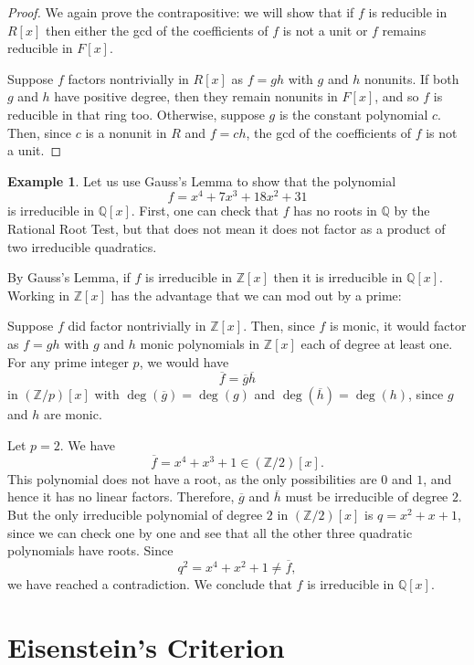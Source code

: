 \documentclass[12pt]{report}
\numberwithin{equation}{section}
\numberwithin{theorem}{chapter}
\theoremstyle{definition}
\newtheorem{example}[theorem]{Example}
\newtheorem*{basic properties}{Basic Properties}
\newtheorem*{Important Remark}{Important Remark}
\begin{document}
\begin{proof}
We again prove the contrapositive: we will show that if $f$ is reducible in $R[x]$ then either the gcd of the coefficients of $f$ is not a unit or $f$ remains  reducible in $F[x]$. 

Suppose $f$ factors nontrivially in $R[x]$ as $f = g h$ with $g$ and $h$ nonunits.
If both $g$ and $h$ have positive degree, then they remain nonunits in $F[x]$, and so $f$  is reducible in that ring too. Otherwise, suppose $g$ is the constant polynomial $c$.
Then, since $c$ is a nonunit in $R$ and $f = c h$, the gcd of the coefficients of $f$ is not a unit. 
\end{proof}




\begin{example} 
Let us use Gauss's Lemma to show that the polynomial 
$$f = x^4 + 7x^3 + 18x^2 + 31$$ 
is irreducible in $\mathbb{Q}[x]$. First, one can check that $f$ has no roots in $\mathbb{Q}$ by
  the Rational Root Test, but that does not mean it does not factor as a product of two irreducible quadratics.

By Gauss's Lemma, if $f$ is irreducible in $\mathbb{Z}[x]$ then it is irreducible in $\mathbb{Q}[x]$.  Working in $\mathbb{Z}[x]$ has the advantage that we can mod out by a prime:

Suppose $f$ did factor nontrivially in $\mathbb{Z}[x]$. Then, since $f$ is monic, it would factor as $f = g h$ with $g$ and $h$ monic polynomials in $\mathbb{Z}[x]$ each of degree at least one. For any prime integer $p$, we would have 
$$\overline{f} = \overline{g} \overline{h}$$ 
in $(\mathbb{Z}/p)[x]$ with $\deg(\overline{g}) = \deg(g)$ and $\deg(\overline{h}) = \deg(h)$, since $g$ and $h$ are monic. 

Let $p = 2$. We have 
$$\overline{f} = x^4 + x^3 + 1 \in (\mathbb{Z}/2)[x].$$ 
This polynomial does not have a root, as the only possibilities are $0$ and $1$, and hence it has no linear factors. Therefore, $\overline{g}$ and $\overline{h}$ must be irreducible of degree $2$. 
But the only irreducible polynomial of degree $2$ in $(\mathbb{Z}/2)[x]$ is $q = x^2+x + 1$, since we can check one by one and see that all the other three quadratic polynomials have roots.
Since 
$$q^2 = x^4 + x^2 + 1 \ne \overline{f},$$ 
we have reached a contradiction. We conclude that $f$ is irreducible in $\mathbb{Q}[x]$. 
\end{example}




\section{Eisenstein's Criterion}
\end{document}
